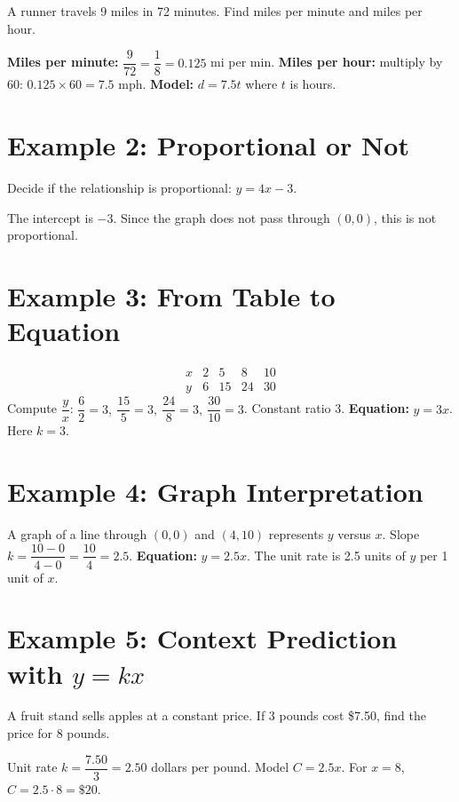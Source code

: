 \documentclass[12pt]{article}
\begin{document}
A runner travels 9 miles in 72 minutes. Find miles per minute and miles per hour.

\textbf{Miles per minute:} \(\dfrac{9}{72} = \dfrac{1}{8} = 0.125\) mi per min.  
\textbf{Miles per hour:} multiply by 60: \(0.125 \times 60 = 7.5\) mph.  
\textbf{Model:} \(d = 7.5t\) where \(t\) is hours.

\section*{Example 2: Proportional or Not}

Decide if the relationship is proportional: \(y = 4x - 3\).

The intercept is \(-3\). Since the graph does not pass through \((0,0)\), this is not proportional.

\section*{Example 3: From Table to Equation}

\[
\begin{array}{c|cccc}
x & 2 & 5 & 8 & 10\\ \hline
y & 6 & 15 & 24 & 30
\end{array}
\]
Compute \(\dfrac{y}{x}\): \(\dfrac{6}{2}=3,\ \dfrac{15}{5}=3,\ \dfrac{24}{8}=3,\ \dfrac{30}{10}=3\). Constant ratio 3.  
\textbf{Equation:} \(y = 3x\). Here \(k=3\).

\section*{Example 4: Graph Interpretation}

A graph of a line through \((0,0)\) and \((4,10)\) represents \(y\) versus \(x\).  
Slope \(k = \dfrac{10-0}{4-0} = \dfrac{10}{4} = 2.5\).  
\textbf{Equation:} \(y = 2.5x\). The unit rate is 2.5 units of \(y\) per 1 unit of \(x\).

\section*{Example 5: Context Prediction with \(y = kx\)}

A fruit stand sells apples at a constant price. If 3 pounds cost \$7.50, find the price for 8 pounds.

Unit rate \(k = \dfrac{7.50}{3} = 2.50\) dollars per pound.  
Model \(C = 2.5x\). For \(x=8\), \(C = 2.5 \cdot 8 = \$20\).
\end{document}
